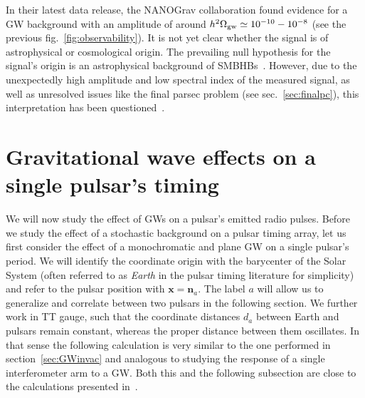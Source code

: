 In their latest data release, the \ac{NANOGrav} collaboration found evidence for a \ac{GW} background with an amplitude of around $h^2 \Omega_{\text{gw}} \simeq 10^{-10} - 10^{-8}$ (see the previous fig.~\ref{fig:observability}). It is not yet clear whether the signal is of astrophysical or  cosmological origin. The prevailing null hypothesis for the signal's origin is an astrophysical background of \acsp{SMBHB}~\cite{NANOGrav:2023pdq}. However, due to the unexpectedly high amplitude and low spectral index of the measured signal, as well as unresolved issues like the final parsec problem (see sec.~\ref{sec:finalpc}), this interpretation has been questioned~\cite{NANOGrav:2023hvm}.


\section{Gravitational wave effects on a single pulsar's timing} \label{sec:singleGWPTA}

We will now study the effect of \acp{GW} on a pulsar's emitted radio pulses. Before we study the effect of a stochastic background on a pulsar timing array, let us first consider the effect of a monochromatic and plane \ac{GW} on a single pulsar's period. We will identify the coordinate origin with the barycenter of the Solar System (often referred to as \textit{Earth} in the pulsar timing literature for simplicity) and refer to the pulsar position with $\bm{x} = \bm{n}_a$. The label $a$ will allow us to generalize and correlate between two pulsars in the following  section. We further work in \ac{TT} gauge, such that the coordinate distances $d_a$ between Earth and pulsars remain constant, whereas the proper distance between them oscillates. In that sense the following calculation is very similar to the one performed in section~\ref{sec:GWinvac} and analogous to studying the response of a single interferometer arm to a \ac{GW}. Both this and the following subsection are close to the calculations presented in~\cite{Maggiore:2018sht, Taylor:2021yjx}.

